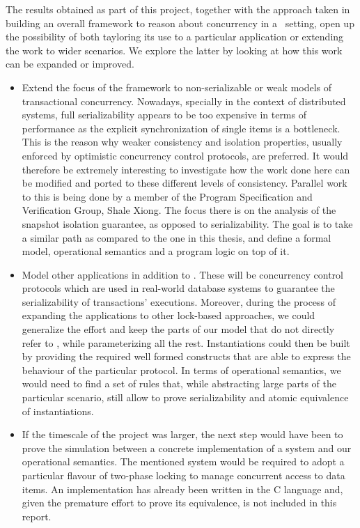 The results obtained as part of this project, together with the approach taken in building an overall framework to reason about concurrency in a \tpl\ setting, open up the possibility of both tayloring its use to a particular application or extending the work to wider scenarios. We explore the latter by looking at how this work can be expanded or improved.
\begin{itemize}
	\item Extend the focus of the framework to non-serializable or weak models of transactional concurrency. Nowadays, specially in the context of distributed systems, full serializability appears to be too expensive in terms of performance as the explicit synchronization of single items is a bottleneck. This is the reason why weaker consistency and isolation properties, usually enforced by optimistic concurrency control protocols, are preferred. It would therefore be extremely interesting to investigate how the work done here can be modified and ported to these different levels of consistency.  Parallel work to this is being done by a member of the Program Specification and Verification Group, Shale Xiong. The focus there is on the analysis of the snapshot isolation guarantee, as opposed to serializability. The goal is to take a similar path as compared to the one in this thesis, and define a formal model, operational semantics and a program logic on top of it.
	
	\item Model other applications in addition to \tpl. These will be concurrency control protocols which are used in real-world database systems to guarantee the serializability of transactions' executions. Moreover, during the process of expanding the applications to other lock-based approaches, we could generalize the effort and keep the parts of our model that do not directly refer to \tpl, while parameterizing all the rest. Instantiations could then be built by providing the required well formed constructs that are able to express the behaviour of the particular protocol. In terms of operational semantics, we would need to find a set of rules that, while abstracting large parts of the particular scenario, still allow to prove serializability and atomic equivalence of instantiations.
	
	\item If the timescale of the project was larger, the next step would have been to prove the simulation between a concrete implementation of a system and our operational semantics. The mentioned system would be required to adopt a particular flavour of two-phase locking to manage concurrent access to data items. An implementation has already been written in the C language and, given the premature effort to prove its equivalence, is not included in this report.
	

\end{itemize}
